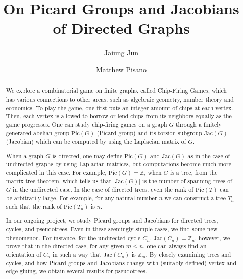 \documentclass[11pt,reqno]{amsart}
\theoremstyle{definition}
\theoremstyle{plain}
\begin{document}
\title{On Picard Groups and Jacobians of Directed Graphs}
%

\author{Jaiung Jun}
\address{Department of Mathematics, State University of New York at New Paltz, NY 12561, USA}

\author{Matthew Pisano}
\address{Department of Mathematics, State University of New York at New Paltz, NY 12561, USA}


%

%
\makeatletter
{}
\makeatother


\begin{abstract}
	We explore a combinatorial game on finite graphs, called Chip-Firing Games,
	which has various connections to other areas, such as algebraic geometry, number theory and economics.
	To play the game, one first puts an integer amount of chips at each vertex. Then,
	each vertex is allowed to borrow or lend chips from its neighbors equally as the game progresses. One can study chip-firing games on a graph $G$ through a finitely generated abelian group $\textrm{Pic}(G)$ (Picard group) and its torsion subgroup $\textrm{Jac}(G)$ (Jacobian) which can be computed by using the Laplacian matrix of $G$.

	When a graph $G$ is directed, one may define $\textrm{Pic}(G)$ and $\textrm{Jac}(G)$ as in the case of undirected
	graphs by using Laplacian matrices, but computations become much more complicated in this case. For example,
	$\textrm{Pic}(G)=\mathbb{Z}$, when $G$ is a tree, from the matrix-tree theorem, which tells us that $|\textrm{Jac}(G)|$ is
	the number of spanning trees of $G$ in the undirected case.
	In the case of directed trees, even the rank of $\textrm{Pic}(T)$ can be arbitrarily large.
	For example, for any natural number $n$ we can construct a tree $T_n$ such that the rank of $\textrm{Pic}(T_n)$ is $n$.

	In our ongoing project, we study Picard groups and Jacobians for directed trees, cycles, and pseudotrees.
	Even in these seemingly simple cases, we find some new phenomenon. For instance, for the undirected cycle $C_n$,
	$\textrm{Jac}(C_n)=\mathbb{Z}_n$, however, we prove that in the directed case, for any given $m \leq n$, one can
	always find an orientation of $C_n$ in such a way that $\textrm{Jac}(C_n)$ is $\mathbb{Z}_m$.
	By closely examining trees and cycles, and how Picard groups and Jacobians change with (suitably defined)
	vertex and edge gluing, we obtain several results for pseudotrees.
\end{abstract}

\maketitle
\end{document}
